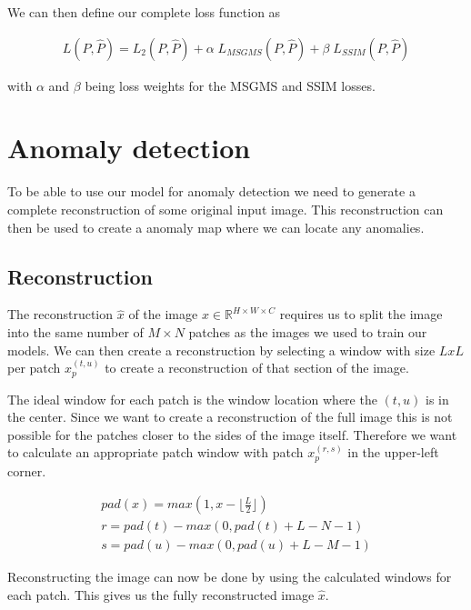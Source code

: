 
We can then define our complete loss function as 

\begin{align}
L(P, \hat{P}) = L_2(P, \hat{P}) + \alpha \; L_{MSGMS}(P, \hat{P}) + \beta \; L_{SSIM}(P, \hat{P})
\end{align}

with $\alpha$ and $\beta$ being loss weights for the MSGMS and SSIM losses.

\section{Anomaly detection}\label{sec:methods:anomaly-detection}

To be able to use our model for anomaly detection we need to generate a complete reconstruction of some original input image. This reconstruction can then be used to create a anomaly map where we can locate any anomalies.

\subsection{Reconstruction}

The reconstruction $\hat{x}$ of the image $x \in \mathbb{R}^{H \times W \times C}$ requires us to split the image into the same number of $M \times N$ patches as the images we used to train our models.
We can then create a reconstruction by selecting a window with size $L x L$ per patch $x_p^{(t,u)}$ to create a reconstruction of that section of the image.

The ideal window for each patch is the window location where the $(t,u)$ is in the center. Since we want to create a reconstruction of the full image this is not possible for the patches closer to the sides of the image itself. Therefore we want to calculate an appropriate patch window with patch $x_p^{(r,s)}$ in the upper-left corner.

%
\begin{align}
pad(x) = max(1, x - \lfloor \frac{L}{2} \rfloor)\\
r = pad(t) - max(0, pad(t) + L - N - 1)\\
s = pad(u) - max(0, pad(u) + L - M - 1)
\end{align}
%

Reconstructing the image can now be done by using the calculated windows for each patch. This gives us the fully reconstructed image $\hat{x}$.

